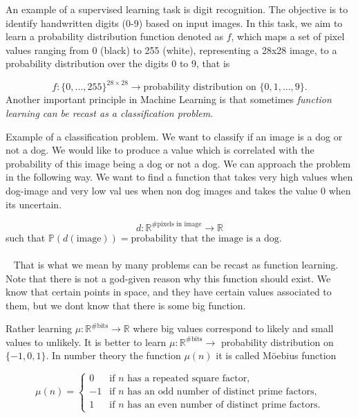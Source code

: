 \documentclass[../main.tex]{subfiles}
\begin{document}
	\begin{xmpl}
		\noindent An example of a supervised learning task is digit recognition. The objective is to identify handwritten digits (0-9) based on input images. In this task, we aim to learn a probability distribution function denoted as $f$, which maps a set of pixel values ranging from 0 (black) to 255 (white), representing a 28x28 image, to a probability distribution over the digits 0 to 9, that is
		
		$$f: \{0,..., 255\}^{28 \times 28} \longrightarrow \text{probability distribution on } \{0,1,...,9\}.$$
	Another important principle in Machine Learning is that sometimes \textit{function learning can be recast as a classification problem}.  
	\end{xmpl}
	\begin{xmpl} Example of a classification problem. We want to classify if an image is a dog or not a dog. We would like to produce a value which is correlated with the probability of this image being a dog or not a dog.  We can approach the problem in the following way. We want to find a function that takes very high values when dog-image and very low val ues when non dog images and takes the value 0 when its uncertain. 
		
		$$d: \mathbb{R}^{\# \text{pixels in image}} \rightarrow \mathbb{R} $$
		such that $\mathbb{P}(d(\text{image})) = \text{probability that the image is a dog.}$ \\ \\  
		That is what we mean by many problems can be recast as function learning. Note that there is not a god-given reason why this function should exist. We know that certain points in space, and they have certain values associated to them, but we dont know that there is some big function. 
	\end{xmpl}
\noindent
	Rather learning $\mu : \mathbb{R}^{\# \text{bits}} \rightarrow \mathbb{R}$ where big values correspond to likely and small values to unlikely. It is better to learn $\mu : \mathbb{R}^{\# \text{bits}} \rightarrow $ probability distribution on $\{-1,0,1\}$. In number theory the function $\mu(n)$ it is called Möebius function 
	
	\[
	\mu(n) = \begin{cases}
		0 & \text{if } n \text{ has a repeated square factor}, \\
		-1 & \text{if } n \text{ has an odd number of distinct prime factors}, \\
		1 & \text{if } n \text{ has an even number of distinct prime factors}.
	\end{cases}
	\]
	
\end{document}
